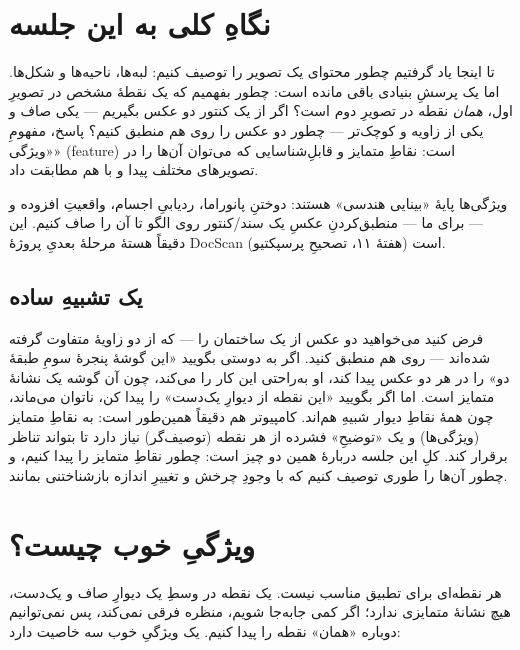 \documentclass[12pt]{article}
\begin{document}

\section*{نگاهِ کلی به این جلسه}

تا اینجا یاد گرفتیم چطور محتوای یک تصویر را توصیف کنیم: لبه‌ها، ناحیه‌ها و شکل‌ها. اما یک پرسشِ بنیادی باقی مانده است: چطور بفهمیم که یک نقطهٔ مشخص در تصویرِ اول، \emph{همان} نقطه در تصویرِ دوم است؟ اگر از یک کنتور دو عکس بگیریم — یکی صاف و یکی از زاویه و کوچک‌تر — چطور دو عکس را روی هم منطبق کنیم؟ پاسخ، مفهومِ «ویژگی» (feature) است: نقاطِ متمایز و قابلِ‌شناسایی که می‌توان آن‌ها را در تصویرهای مختلف پیدا و با هم مطابقت داد.

\begin{yaddasht}
ویژگی‌ها پایهٔ «بینایی هندسی» هستند: دوختنِ پانوراما، ردیابیِ اجسام، واقعیتِ افزوده و — برای ما — منطبق‌کردنِ عکسِ یک سند/کنتور روی الگو تا آن را صاف کنیم. این دقیقاً هستهٔ مرحلهٔ بعدیِ پروژهٔ DocScan (هفتهٔ ۱۱، تصحیحِ پرسپکتیو) است.
\end{yaddasht}

\subsection*{یک تشبیهِ ساده}

فرض کنید می‌خواهید دو عکس از یک ساختمان را — که از دو زاویهٔ متفاوت گرفته شده‌اند — روی هم منطبق کنید. اگر به دوستی بگویید «این گوشهٔ پنجرهٔ سومِ طبقهٔ دو» را در هر دو عکس پیدا کند، او به‌راحتی این کار را می‌کند، چون آن گوشه یک نشانهٔ متمایز است. اما اگر بگویید «این نقطه از دیوارِ یک‌دست» را پیدا کن، ناتوان می‌ماند، چون همهٔ نقاطِ دیوار شبیهِ هم‌اند. کامپیوتر هم دقیقاً همین‌طور است: به نقاطِ متمایز (ویژگی‌ها) و یک «توضیحِ» فشرده از هر نقطه (توصیف‌گر) نیاز دارد تا بتواند تناظر برقرار کند. کلِ این جلسه دربارهٔ همین دو چیز است: چطور نقاطِ متمایز را پیدا کنیم، و چطور آن‌ها را طوری توصیف کنیم که با وجودِ چرخش و تغییرِ اندازه بازشناختنی بمانند.

\section{ویژگیِ خوب چیست؟}

هر نقطه‌ای برای تطبیق مناسب نیست. یک نقطه در وسطِ یک دیوارِ صاف و یک‌دست، هیچ نشانهٔ متمایزی ندارد؛ اگر کمی جابه‌جا شویم، منظره فرقی نمی‌کند، پس نمی‌توانیم دوباره «همان» نقطه را پیدا کنیم. یک ویژگیِ خوب سه خاصیت دارد:
\end{document}
